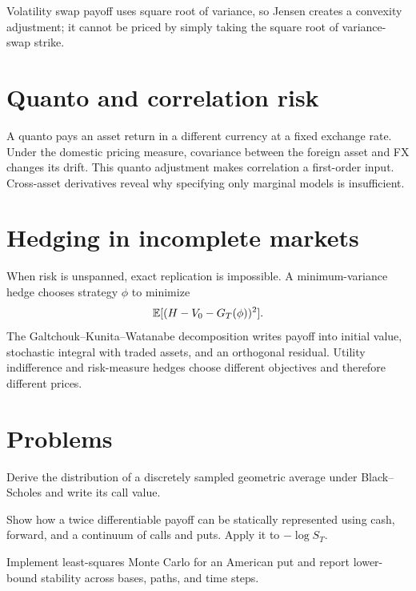 Volatility swap payoff uses square root of variance, so Jensen creates a convexity
adjustment; it cannot be priced by simply taking the square root of variance-swap
strike.

\section{Quanto and correlation risk}

A quanto pays an asset return in a different currency at a fixed exchange rate.
Under the domestic pricing measure, covariance between the foreign asset and FX
changes its drift. This quanto adjustment makes correlation a first-order input.
Cross-asset derivatives reveal why specifying only marginal models is insufficient.

\section{Hedging in incomplete markets}

When risk is unspanned, exact replication is impossible. A minimum-variance hedge
chooses strategy $\phi$ to minimize
\[
\operatorname{\mathbb E}[(H-V_0-G_T(\phi))^2].
\]
The Galtchouk--Kunita--Watanabe decomposition writes payoff into initial value,
stochastic integral with traded assets, and an orthogonal residual. Utility
indifference and risk-measure hedges choose different objectives and therefore
different prices.

\section{Problems}

\begin{exercise}
Derive the distribution of a discretely sampled geometric average under
Black--Scholes and write its call value.
\end{exercise}
\begin{exercise}
Show how a twice differentiable payoff can be statically represented using cash,
forward, and a continuum of calls and puts. Apply it to $-\log S_T$.
\end{exercise}
\begin{exercise}
Implement least-squares Monte Carlo for an American put and report lower-bound
stability across bases, paths, and time steps.
\end{exercise}
